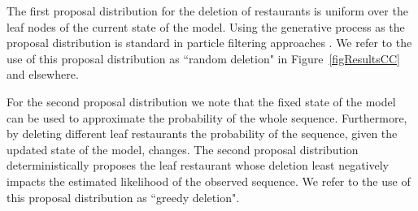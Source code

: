 The first proposal distribution for the deletion of restaurants is uniform over the leaf nodes of the current state of the model.  Using the generative process as the proposal distribution is standard in particle filtering approaches \cite{Doucet2001}.  We refer to the use of this proposal distribution as ``random deletion" in Figure~\ref{figResultsCC} and elsewhere.

For the second proposal distribution we note that the fixed state of the model can be used to approximate the probability of the whole sequence. Furthermore, by deleting different leaf restaurants the probability of the sequence, given the updated state of the model, changes. The second proposal distribution deterministically proposes the leaf restaurant whose deletion least negatively impacts the estimated likelihood of the observed sequence.  We refer to the use of this proposal distribution as ``greedy deletion".





